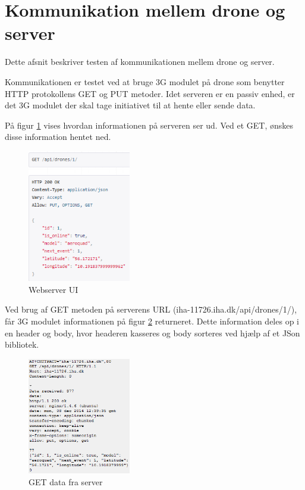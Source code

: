 \section{Kommunikation mellem drone og server}

Dette afsnit beskriver testen af kommunikationen mellem drone og server. 

Kommunikationen er testet ved at bruge 3G modulet på drone som benytter HTTP protokollens GET og PUT metoder. 
Idet serveren er en passiv enhed, er det 3G modulet der skal tage initiativet til at hente eller sende data. 

På figur \ref{fig:integrationstest_webserver} vises hvordan informationen på serveren ser ud. Ved et GET, ønskes disse information hentet ned. 

\begin{figure}[H]
\centering
\includegraphics[width=0.4\textwidth]{Billeder/Test/integratest_webserver.png}
\caption{Webserver UI}
\label{fig:integrationstest_webserver}
\end{figure}

Ved brug af GET metoden på serverens URL (iha-11726.iha.dk/api/drones/1/), får 3G modulet informationen på figur \ref{fig:getfromserver} returneret. Dette information deles op i en header og body, hvor headeren kasseres og body sorteres ved hjælp af et JSon bibliotek.

\begin{figure}[H]
\centering
\includegraphics[width=0.4\textwidth]{Billeder/Test/getfromserver.png}
\caption{GET data fra server}
\label{fig:getfromserver}
\end{figure}

